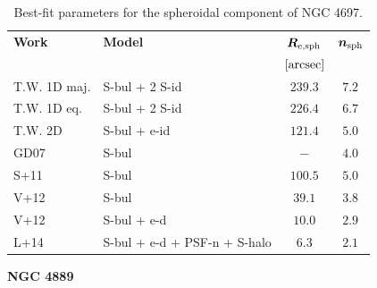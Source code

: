 \documentclass[preprint2]{emulateapj}
\begin{document}
  \begin{table}[h]
  \small
  \caption{Best-fit parameters for the spheroidal component of NGC 4697.}
  \begin{center}
  \begin{tabular}{llcc}
  \hline
  {\bf Work} & {\bf Model}   & $\bm R_{\rm e,sph}$    & $\bm n_{\rm sph}$ \\
    &  &  $[\rm arcsec]$ & \\
  \hline
  T.W. 1D maj. & S-bul + 2 S-id & $239.3$  &  $7.2$ \\
  T.W. 1D eq.  & S-bul + 2 S-id & $226.4$  &  $6.7$ \\
  T.W. 2D      & S-bul + e-id	& $121.4$  &  $5.0$ \\
  \hline
  GD07  & S-bul & $-$  &  $4.0$ \\
  S+11  & S-bul & $100.5$  &  $5.0$ \\
  V+12  & S-bul & $39.1$  &  $3.8$ \\
  V+12  & S-bul + e-d & $10.0$  &  $2.9$ \\
  L+14  & S-bul + e-d + PSF-n + S-halo & $6.3$  &  $2.1$ \\
  \hline
  \end{tabular}
  \end{center}
  \label{tab:n4697}
  \end{table}

  \clearpage\newpage\noindent
  {\bf NGC 4889 \\}
\end{document}
